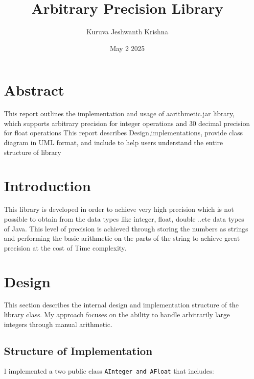 \documentclass{article}
\title{Arbitrary Precision Library}
\author{Kuruva Jeshwanth Krishna}
\date{May 2 2025}
\begin{document}
\maketitle

\section{Abstract}
This report outlines the implementation and usage of aarithmetic.jar library, which supports arbitrary precision for integer operations and 30 decimal precision for float operations
This report describes Design,implementations, provide class diagram in UML format, and include to help users understand the entire structure of library 

\section{Introduction}
This library is developed in order to achieve very high precision which is not possible to obtain from the data types like integer, float, double ..etc  data types of  Java. This level of precision is  achieved through storing the numbers as strings and performing the basic arithmetic on the parts of the string to achieve great precision at the cost of Time complexity.

\section{Design}

This section describes the internal design and implementation structure of the library class. My approach focuses on the ability to handle arbitrarily large integers through manual arithmetic.

\subsection{Structure of Implementation}

I implemented a two public class \texttt{AInteger and AFloat} that includes:
\end{document}
